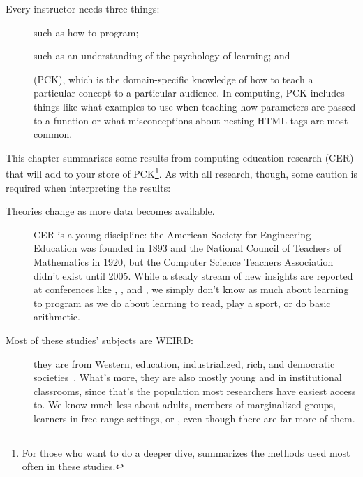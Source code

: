 
Every instructor needs three things:

\begin{description}

\item[]
  such as how to program;

\item[]
  such as an understanding of the psychology of learning;
  and

\item[]
  (PCK),
  which is the domain-specific knowledge of
  how to teach a particular concept to a particular audience.
  In computing,
  PCK includes things like what examples to use when teaching how parameters are passed to a function
  or what misconceptions about nesting HTML tags are most common.

\end{description}

This chapter summarizes some results from computing education research (CER)
that will add to your store of PCK\footnote{
    For those who want to do a deeper dive,
    \cite{Ihan2016} summarizes the methods used most often in these studies.}.
As with all research,
though,
some caution is required when interpreting the results:

\begin{description}

\item[Theories change as more data becomes available.]
  CER is a young discipline:
  the American Society for Engineering Education was founded in 1893
  and the National Council of Teachers of Mathematics in 1920,
  but the Computer Science Teachers Association didn't exist until 2005.
  While a steady stream of new insights are reported at conferences like ,
  ,
  and ,
  we simply don't know as much about learning to program
  as we do about learning to read,
  play a sport,
  or do basic arithmetic.

\item[Most of these studies' subjects are WEIRD:]
  they are from Western, education, industrialized, rich, and democratic societies~\cite{Henr2010}.
  What's more,
  they are also mostly young and in institutional classrooms,
  since that's the population most researchers have easiest access to.
  We know much less about adults,
  members of marginalized groups,
  learners in free-range settings,
  or ,
  even though there are far more of them.

\end{description}

